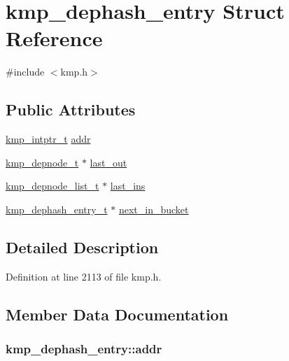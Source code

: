 \hypertarget{structkmp__dephash__entry}{\section{kmp\-\_\-dephash\-\_\-entry Struct Reference}
\label{structkmp__dephash__entry}
}


{\ttfamily \#include $<$kmp.\-h$>$}

\subsection*{Public Attributes}
\begin{DoxyCompactItemize}
\item 
\hyperlink{kmp__os_8h_a43fe09095a192381a5e7c93d20a3a2f9}{kmp\-\_\-intptr\-\_\-t} \hyperlink{structkmp__dephash__entry_a6bddf4b7f2ea115a0bed6b8caa791ef1}{addr}
\item 
\hyperlink{kmp_8h_a5197537dbef055a1d52ecdcbf5578098}{kmp\-\_\-depnode\-\_\-t} $\ast$ \hyperlink{structkmp__dephash__entry_a0ae786669b6c8b01605717a93f8c2c33}{last\-\_\-out}
\item 
\hyperlink{kmp_8h_a877b10d3438c1c7864488165c95be189}{kmp\-\_\-depnode\-\_\-list\-\_\-t} $\ast$ \hyperlink{structkmp__dephash__entry_ad54a7a6e0b862b27750bed4730e2d9b0}{last\-\_\-ins}
\item 
\hyperlink{kmp_8h_ae26b65abb82278a8c3dc261171d399d5}{kmp\-\_\-dephash\-\_\-entry\-\_\-t} $\ast$ \hyperlink{structkmp__dephash__entry_a2708bddc7160e13ec29ba5f36cd37e1a}{next\-\_\-in\-\_\-bucket}
\end{DoxyCompactItemize}


\subsection{Detailed Description}


Definition at line 2113 of file kmp.\-h.



\subsection{Member Data Documentation}
\hypertarget{structkmp__dephash__entry_a6bddf4b7f2ea115a0bed6b8caa791ef1}{
\subsubsection[{addr}]{ kmp\-\_\-dephash\-\_\-entry\-::addr}}\label{structkmp__dephash__entry_a6bddf4b7f2ea115a0bed6b8caa791ef1}


